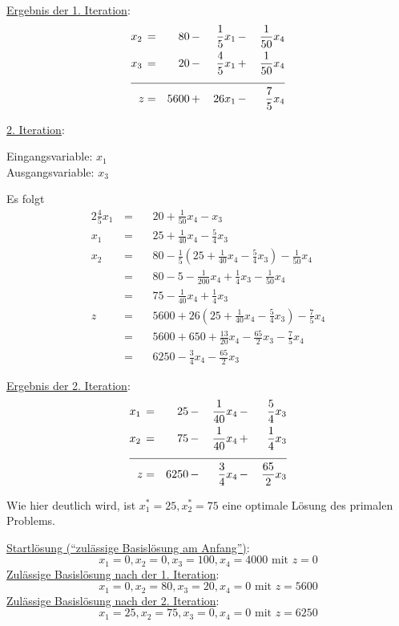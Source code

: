\documentclass[10pt,a4paper,oneside,ngerman,numbers=noenddot]{scrartcl}
\begin{document}
			\underline{Ergebnis der 1. Iteration}:
			\begin{alignat*}{4}
				x_{2} \,&=&\, 80 \,&-&\, \frac{1}{5}x_{1} \,&-&\, \frac{1}{50}x_{4} \\
				x_{3} \,&=&\, 20 \,&-&\, \frac{4}{5}x_{1} \,&+&\, \frac{1}{50}x_{4} \\ \cline{1 - 7}
				z &=& 5600 \,&+&\, 26x_{1} \,&-&\, \frac{7}{5}x_{4}
			\end{alignat*}
			
			\underline{2. Iteration}:
		
			Eingangsvariable: $x_{1}$\\
			Ausgangsvariable: $x_{3}$
		
			Es folgt
			\begin{alignat*}{2}
				\frac{4}{5}x_{1} \,&=&&\, 20 +  \frac{1}{50}x_{4} - x_{3} \\
				x_{1} \,&=&&\, 25 + \frac{1}{40}x_{4} - \frac{5}{4}x_{3} \\
				x_{2} \,&=&&\, 80 - \frac{1}{5}\left(25 + \frac{1}{40}x_{4} - \frac{5}{4}x_{3}\right) - \frac{1}{50}x_{4} \\
				&=&&\, 80 - 5 - \frac{1}{200}x_{4} + \frac{1}{4}x_{3} - \frac{1}{50}x_{4} \\
				&=&&\, 75 - \frac{1}{40}x_{4} + \frac{1}{4}x_{3} \\
				z \,&=&&\, 5600 + 26\left(25 + \frac{1}{40}x_{4} - \frac{5}{4}x_{3}\right) - \frac{7}{5}x_{4} \\
				&=&&\, 5600 + 650 + \frac{13}{20}x_{4} - \frac{65}{2}x_{3} - \frac{7}{5}x_{4} \\
				&=&&\, 6250 - \frac{3}{4}x_{4} - \frac{65}{2}x_{3}
			\end{alignat*}
		
			\underline{Ergebnis der 2. Iteration}:
			\begin{alignat*}{4}
				x_{1} \,&=&\, 25 \,&-&\, \frac{1}{40}x_{4} \,&-&\, \frac{5}{4}x_{3} \\
				x_{2} \,&=&\, 75 \,&-&\, \frac{1}{40}x_{4} \,&+&\, \frac{1}{4}x_{3} \\ \cline{1 - 7}
				z &=& 6250 \,&-&\, \frac{3}{4}x_{4} \,&-&\, \frac{65}{2}x_{3}
			\end{alignat*}
			
			Wie hier deutlich wird, ist $x_{1}^{*} = 25, x_{2}^{*} = 75$ eine optimale Lösung des primalen Problems.
			
			\underline{Startlösung ("`zulässige Basislösung am Anfang"')}:
			\[
				x_{1} = 0, x_{2} = 0, x_{3} = 100, x_{4} = 4000 \text{ mit } z = 0
			\]
			\underline{Zulässige Basislösung nach der 1. Iteration}:
			\[
				x_{1} = 0, x_{2} = 80, x_{3} = 20, x_{4} = 0 \text{ mit } z = 5600
			\]
			\underline{Zulässige Basislösung nach der 2. Iteration}:
			\[
				x_{1} = 25, x_{2} = 75, x_{3} = 0, x_{4} = 0 \text{ mit } z = 6250
			\]
			
\end{document}
